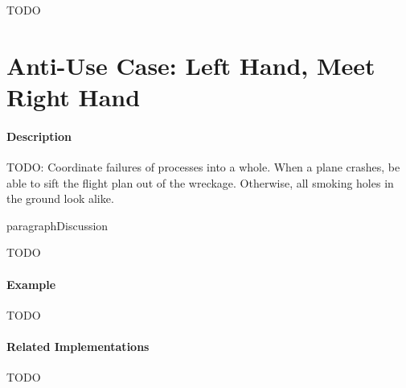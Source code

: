 {\Large TODO}

\section{Anti-Use Case: Left Hand, Meet Right Hand}

\paragraph{Description}

{\Large TODO:} Coordinate failures of processes into a whole. When a plane crashes, be able to sift the flight plan out of the wreckage. Otherwise, all smoking holes in the ground look alike.

paragraph{Discussion}

{\Large TODO}

\paragraph{Example}

{\Large TODO}

\paragraph{Related Implementations}

{\Large TODO}
